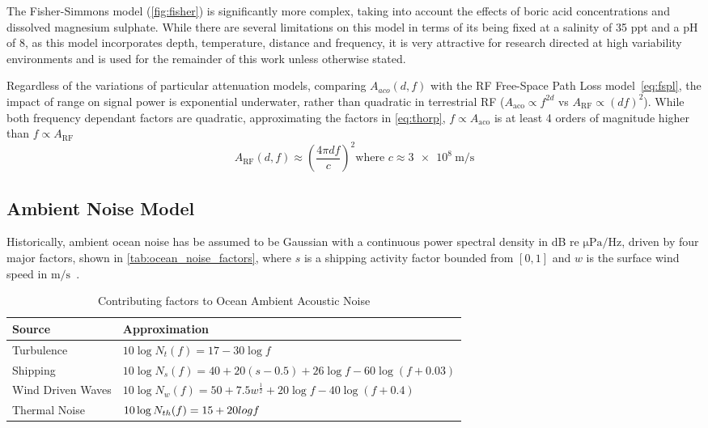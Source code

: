 %
The Fisher-Simmons model (\autoref{fig:fisher}) is significantly more complex, taking into account the effects of boric acid concentrations and dissolved magnesium sulphate. While there are several limitations on this model in terms of its being fixed at a salinity of 35 ppt and a pH of 8, as this model incorporates depth, temperature, distance and frequency, it is very attractive for research directed at high variability environments and is used for the remainder of this work unless otherwise stated.




Regardless of the variations of particular attenuation models, comparing $A_{aco}(d,f)$ with the RF Free-Space Path Loss model~\autoref{eq:fspl}, the impact of range on signal power is exponential underwater, rather than quadratic in terrestrial RF ($A_{\text{aco}} \propto f^{2d}$ vs $A_{\text{RF}} \propto (df)^2$). 
While both frequency dependant factors are quadratic, approximating the factors in \autoref{eq:thorp}, $f\propto A_{\text{aco}}$ is at least 4 orders of magnitude higher than $f\propto A_{\text{RF}}$
\begin{equation}
  \label{eq:fspl}
  A_{\text{RF}}(d,f) \approx \left( \frac{4\pi d f}{c} \right)^2
  \text{where }c\approx \SI{3e8}{\meter\per\second}
\end{equation}


 \subsection{Ambient Noise Model}\label{sec:ambient-noise-model}

 Historically, ambient ocean noise has be assumed to be Gaussian with a continuous power spectral density in dB re $\si{\micro\pascal\per\hertz}$, driven by four major factors, shown in \autoref{tab:ocean_noise_factors}, where $s$ is a shipping activity factor bounded from $[0,1]$ and $w$ is the surface wind speed in $\si{\meter\per\second}$~\cite{coates1989}.

\begin{table}[h]\centering
  \caption{Contributing factors to Ocean Ambient Acoustic Noise}
  \label{tab:ocean_noise_factors}
  \begin{tabularx}{\textwidth}{p{3.5cm} X}\toprule
    Source & Approximation \\ \midrule
    Turbulence & $10 \log N_t(f)=17-30\log f$\\
    Shipping & $10 \log N_s(f) = 40+20(s-0.5)+26\log f-60\log(f+0.03)$\\
    Wind Driven Waves & $10\log N_w(f) = 50+7.5w^{\frac{1}{2}}+20\log f - 40\log(f+0.4)$\\ 
    Thermal Noise & $10\log N_{th}(f) = \-15 + 20 log f$\\\bottomrule
  \end{tabularx}
\end{table}


